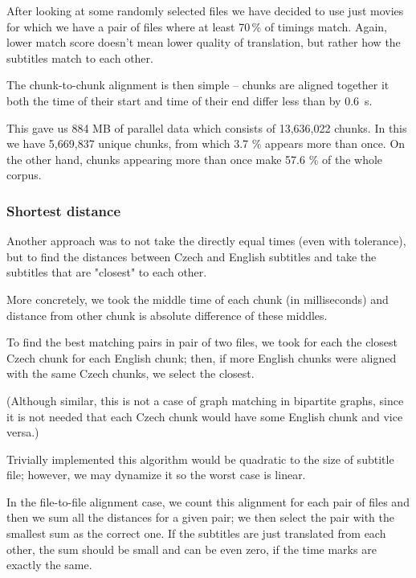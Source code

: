 
After looking at some randomly selected files we have decided to use just movies for which we have a pair of files where at least 70\,\% of timings match. Again, lower match score doesn't mean lower quality of translation, but rather how the subtitles match to each other. 

The chunk-to-chunk alignment is then simple -- chunks are aligned together it both the time of their start and time of their end differ less than by 0.6\ s.

This gave us 884 MB of parallel data which consists of 13,636,022 chunks. In this we have 5,669,837 unique chunks, from which 3.7 \% appears more than once. On the other hand, chunks appearing more than once make 57.6 \% of the whole corpus.

\subsubsection{Shortest distance}
Another approach was to not take the directly equal times (even with tolerance), but to find the distances between Czech and English subtitles and take the subtitles that are "closest" to each other.

More concretely, we took the middle time of each chunk (in milliseconds) and distance from other chunk is absolute difference of these middles. 

To find the best matching pairs in pair of two files, we took for each  the closest Czech chunk for each English chunk; then, if more English chunks were aligned with the same Czech chunks, we select the closest.

(Although similar, this is not a case of graph matching in bipartite graphs, since it is not needed that each Czech chunk would have some English chunk and vice versa.)

Trivially implemented this algorithm would be quadratic to the size of subtitle file; however, we may dynamize it so the worst case is linear.

In the file-to-file alignment case, we count this alignment for each pair of files and then we sum all the distances for a given pair; we then select the pair with the smallest sum as the correct one. If the subtitles are just translated from each other, the sum should be small and can be even zero, if the time marks are exactly the same.

